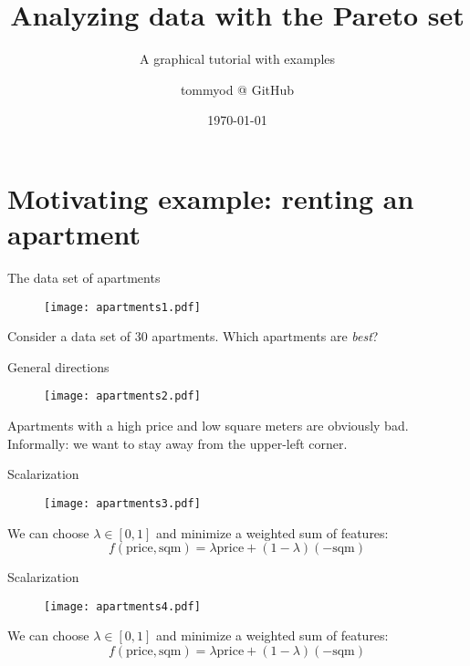 \documentclass[11pt, aspectratio=149]{beamer}
\title{Analyzing data with the Pareto set}
\subtitle{A graphical tutorial with examples}
\date{\today}
\author{tommyod @ GitHub}
\theoremstyle{plain}
\begin{document}
\maketitle


\section{Motivating example: renting an apartment}

\begin{frame}[fragile, t]{The data set of apartments}
	\begin{figure}
		\centering
		\texttt{[image: apartments1.pdf]}
	\end{figure}
	Consider a data set of $30$ apartments. Which apartments are \emph{best}?
	\vfill
\end{frame}

\begin{frame}[fragile, t]{General directions}
	\begin{figure}
		\centering
		\texttt{[image: apartments2.pdf]}
	\end{figure}
	Apartments with a high price and low square meters are obviously bad.
	Informally: we want to stay away from the upper-left corner.
	\vfill
\end{frame}

\begin{frame}[fragile, t]{Scalarization}
	\begin{figure}
		\centering
		\texttt{[image: apartments3.pdf]}
	\end{figure}
	We can choose $\lambda \in [0, 1]$ and minimize a weighted sum of features:
	\begin{equation*}
		f(\text{price}, \text{sqm}) = \lambda \text{price} + (1 -\lambda) (-\text{sqm})
	\end{equation*}
	\vfill
\end{frame}

\begin{frame}[fragile, t]{Scalarization}
	\begin{figure}
		\centering
		\texttt{[image: apartments4.pdf]}
	\end{figure}
	We can choose $\lambda \in [0, 1]$ and minimize a weighted sum of features:
	\begin{equation*}
	f(\text{price}, \text{sqm}) = \lambda \text{price} + (1 -\lambda) (-\text{sqm})
	\end{equation*}
	\vfill
\end{frame}
\end{document}
